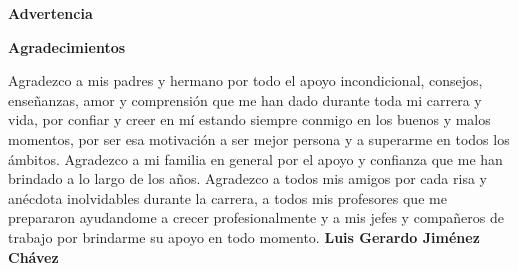 \documentclass[12pt]{report}
\begin{document}
\begin{center}
\begin{LARGE}
	\textbf {Advertencia}\\
\end{LARGE}

\vspace*{0.2in}

\fboxrule 2.5pt\hfill

\end{center}

\newpage

\begin{center}
	\begin{LARGE}
		\textbf {Agradecimientos}\\
	\end{LARGE}
\end{center}
Agradezco a mis padres y hermano por todo el apoyo incondicional, consejos, enseñanzas, amor y comprensión que me han dado durante toda mi carrera y vida, por confiar y creer en mí estando siempre conmigo en los buenos y malos momentos, por ser esa motivación a ser mejor persona y a superarme en todos los ámbitos. Agradezco a mi familia en general por el apoyo y confianza que me han brindado a lo largo de los años. Agradezco a todos mis amigos por cada risa y anécdota inolvidables durante la carrera, a todos mis profesores que me prepararon ayudandome a crecer profesionalmente y a mis jefes y compañeros de trabajo por brindarme su apoyo en todo momento.
\textbf{Luis Gerardo Jiménez Chávez}\\
\end{document}
